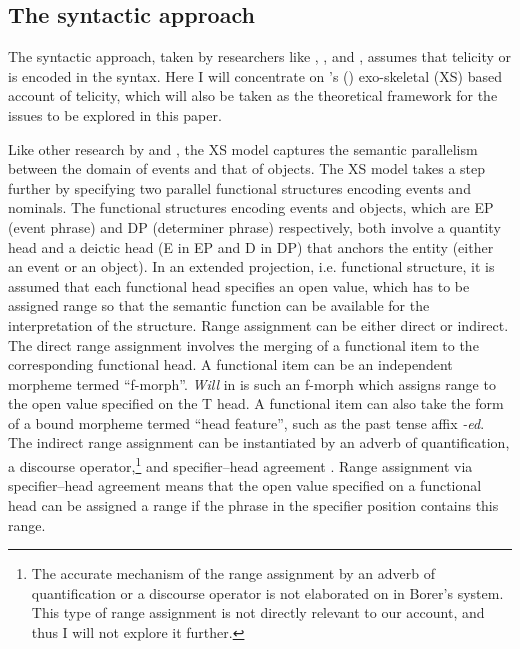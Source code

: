 \documentclass[output=paper]{langsci/langscibook}
\begin{document}
\subsection{The syntactic approach}\largerpage

The syntactic approach, taken by researchers like
\textcite{Borer2005a,Borer2005b}, \textcite{MacDonald2008}, and
\textcite{travis2010inner}, assumes that telicity or  is encoded in
the syntax. Here I will concentrate on \citeauthor{Borer2005b}'s
(\citeyear{Borer2005a,Borer2005b}) exo-skeletal (XS) based account of
telicity, which will also be taken as the theoretical framework for the issues
to be explored in this paper.

Like other research by \textcite{bach1986algebra} and
\textcite{Rothstein2004}, the XS model
captures the semantic parallelism between the domain of events and that of
objects. The XS model takes a step further by specifying two parallel
functional structures encoding events and nominals. The functional structures
encoding events and objects, which are EP (event phrase) and DP (determiner
phrase) respectively, both involve a quantity head and a deictic head (E in EP
and D in DP) that anchors the entity (either an event or an object). In an
extended projection, i.e. functional structure, it is assumed that each
functional head specifies an open value, which has to be assigned range so that
the semantic function can be available for the interpretation of the structure.
Range assignment can be either direct or indirect. The direct range assignment
involves the merging of a functional item to the corresponding functional head.
A functional item can be an independent morpheme termed \enquote{f-morph}.
\emph{Will} in  is such an f-morph which assigns range to the open value
specified on the T head. A functional item can also take the form of a bound
morpheme termed \enquote{head feature}, such as the  past tense affix
\emph{-ed}.  The indirect range assignment can be instantiated by an adverb of
quantification, a discourse operator,\footnote{The accurate mechanism of the
    range assignment by an adverb of quantification or a discourse operator is
not elaborated on in Borer’s system. This type of range assignment is not
directly relevant to our account, and thus I will not explore it further.} and
specifier--head agreement \citep[18]{Borer2005b}. Range assignment via
specifier--head agreement means that the open value specified on a functional
head can be assigned a range if the phrase in the specifier position contains
this range.
\end{document}
